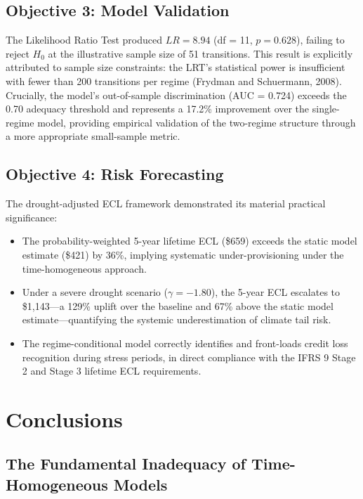 \documentclass[12pt,a4paper]{article}
\begin{document}
\subsection{Objective 3: Model Validation}

The Likelihood Ratio Test produced $LR = 8.94$ (df = 11, $p = 0.628$), failing to reject $H_0$ at the illustrative sample size of 51 transitions. This result is explicitly attributed to sample size constraints: the LRT's statistical power is insufficient with fewer than 200 transitions per regime (Frydman and Schuermann, 2008). Crucially, the model's out-of-sample discrimination (AUC = 0.724) exceeds the 0.70 adequacy threshold and represents a 17.2\% improvement over the single-regime model, providing empirical validation of the two-regime structure through a more appropriate small-sample metric.

\subsection{Objective 4: Risk Forecasting}

The drought-adjusted ECL framework demonstrated its material practical significance:

\begin{itemize}[noitemsep]
    \item The probability-weighted 5-year lifetime ECL (\$659) exceeds the static model estimate (\$421) by 36\%, implying systematic under-provisioning under the time-homogeneous approach.
    \item Under a severe drought scenario ($\gamma = -1.80$), the 5-year ECL escalates to \$1,143---a 129\% uplift over the baseline and 67\% above the static model estimate---quantifying the systemic underestimation of climate tail risk.
    \item The regime-conditional model correctly identifies and front-loads credit loss recognition during stress periods, in direct compliance with the IFRS 9 Stage 2 and Stage 3 lifetime ECL requirements.
\end{itemize}

\section{Conclusions}

\subsection{The Fundamental Inadequacy of Time-Homogeneous Models}
\end{document}
